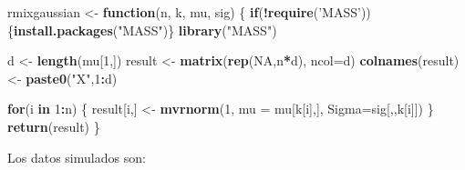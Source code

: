 \documentclass[11pt,]{article}
\newenvironment{Shaded}{\begin{snugshade}}{\end{snugshade}}
\newcommand{\KeywordTok}[1]{\textcolor[rgb]{0.13,0.29,0.53}{\textbf{#1}}}
\newcommand{\DataTypeTok}[1]{\textcolor[rgb]{0.13,0.29,0.53}{#1}}
\newcommand{\DecValTok}[1]{\textcolor[rgb]{0.00,0.00,0.81}{#1}}
\newcommand{\StringTok}[1]{\textcolor[rgb]{0.31,0.60,0.02}{#1}}
\newcommand{\OtherTok}[1]{\textcolor[rgb]{0.56,0.35,0.01}{#1}}
\newcommand{\ControlFlowTok}[1]{\textcolor[rgb]{0.13,0.29,0.53}{\textbf{#1}}}
\newcommand{\OperatorTok}[1]{\textcolor[rgb]{0.81,0.36,0.00}{\textbf{#1}}}
\newcommand{\NormalTok}[1]{#1}
\begin{document}
\begin{Shaded}
\begin{Highlighting}[]
\NormalTok{rmixgaussian <-}\StringTok{ }\ControlFlowTok{function}\NormalTok{(n, k, mu, sig) \{}
  \ControlFlowTok{if}\NormalTok{(}\OperatorTok{!}\KeywordTok{require}\NormalTok{(}\StringTok{'MASS'}\NormalTok{))\{}\KeywordTok{install.packages}\NormalTok{(}\StringTok{"MASS"}\NormalTok{)\} }
  \KeywordTok{library}\NormalTok{(}\StringTok{"MASS"}\NormalTok{)}

\NormalTok{  d <-}\StringTok{ }\KeywordTok{length}\NormalTok{(mu[}\DecValTok{1}\NormalTok{,])}
\NormalTok{  result <-}\StringTok{ }\KeywordTok{matrix}\NormalTok{(}\KeywordTok{rep}\NormalTok{(}\OtherTok{NA}\NormalTok{,n}\OperatorTok{*}\NormalTok{d), }\DataTypeTok{ncol=}\NormalTok{d)}
  \KeywordTok{colnames}\NormalTok{(result) <-}\StringTok{ }\KeywordTok{paste0}\NormalTok{(}\StringTok{"X"}\NormalTok{,}\DecValTok{1}\OperatorTok{:}\NormalTok{d)}
  
  \ControlFlowTok{for}\NormalTok{(i }\ControlFlowTok{in} \DecValTok{1}\OperatorTok{:}\NormalTok{n) \{}
\NormalTok{    result[i,] <-}\StringTok{ }\KeywordTok{mvrnorm}\NormalTok{(}\DecValTok{1}\NormalTok{, }\DataTypeTok{mu =}\NormalTok{ mu[k[i],], }\DataTypeTok{Sigma=}\NormalTok{sig[,,k[i]])}
\NormalTok{  \}}
  \KeywordTok{return}\NormalTok{(result)}
\NormalTok{\}}
\end{Highlighting}
\end{Shaded}

Los datos simulados son:
\end{document}
